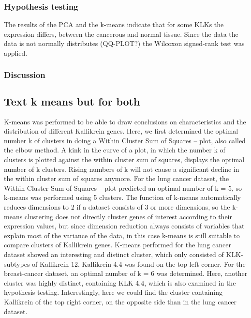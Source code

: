 \documentclass[
]{article}
\begin{document}
\hypertarget{hypothesis-testing}{%
\subsubsection{Hypothesis testing}\label{hypothesis-testing}}

The results of the PCA and the k-means indicate that for some KLKs the
expression differs, between the cancerous and normal tissue. Since the
data the data is not normally distributes (QQ-PLOT?) the Wilcoxon
signed-rank test was applied.

\hypertarget{discussion-1}{%
\subsubsection{Discussion}\label{discussion-1}}

\hypertarget{text-k-means-but-for-both}{%
\subsection{Text k means but for both}\label{text-k-means-but-for-both}}

K-means was performed to be able to draw conclusions on characteristics
and the distribution of different Kallikrein genes. Here, we first
determined the optimal number k of clusters in doing a Within Cluster
Sum of Squares -- plot, also called the elbow method. A kink in the
curve of a plot, in which the number k of clusters is plotted against
the within cluster sum of squares, displays the optimal number of k
clusters. Rising numbers of k will not cause a significant decline in
the within cluster sum of squares anymore. For the lung cancer dataset,
the Within Cluster Sum of Squares -- plot predicted an optimal number of
k = 5, so k-means was performed using 5 clusters. The function of
k-means automatically reduces dimensions to 2 if a dataset consists of 3
or more dimensions, so the k-means clustering does not directly cluster
genes of interest according to their expression values, but since
dimension reduction always consists of variables that explain most of
the variance of the data, in this case k-means is still suitable to
compare clusters of Kallikrein genes. K-means performed for the lung
cancer dataset showed an interesting and distinct cluster, which only
consisted of KLK-subtypes of Kallikrein 12. Kallikrein 4.4 was found on
the top left corner. For the breast-cancer dataset, an optimal number of
k = 6 was determined. Here, another cluster was highly distinct,
containing KLK 4.4, which is also examined in the hypothesis testing.
Interestingly, here we could find the cluster containing Kallikrein of
the top right corner, on the opposite side than in the lung cancer
dataset.
\end{document}
